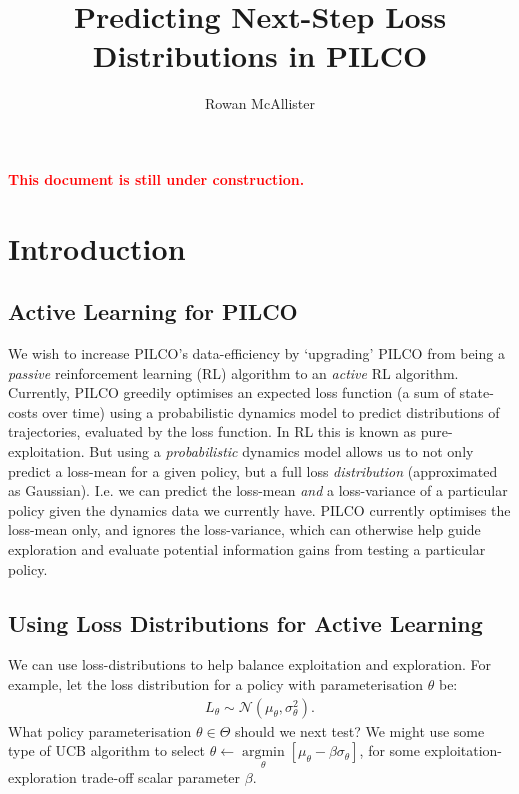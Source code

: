 \documentclass[a4paper,10pt]{article}
\title{Predicting Next-Step Loss Distributions in PILCO}
\author{Rowan McAllister}
\newcommand{\N}{\mathcal{N}}
\newcommand{\red}[1]{\textcolor{red}{#1}}
\begin{document}
\maketitle

\red{\textbf{\large This document is still under construction.}}

\tableofcontents

\section{Introduction}

\subsection{Active Learning for PILCO}
 We wish to increase PILCO's data-efficiency by `upgrading' PILCO
 from being a \textit{passive} reinforcement learning (RL) algorithm
 to an \textit{active} RL algorithm.
 Currently, PILCO greedily optimises an expected loss function (a sum of state-costs over time)
 using a probabilistic dynamics model to predict distributions of trajectories, evaluated by the loss function.
 In RL this is known as pure-exploitation.
 But using a \textit{probabilistic} dynamics model allows us to not only predict a loss-mean for a given policy,
 but a full loss \textit{distribution} (approximated as Gaussian).
 I.e. we can predict the loss-mean \textit{and} a loss-variance of a particular policy
 given the dynamics data we currently have.
 PILCO currently optimises the loss-mean only, and ignores the loss-variance,
 which can otherwise help guide exploration and evaluate potential information gains
 from testing a particular policy.

\subsection{Using Loss Distributions for Active Learning}
 We can use loss-distributions to help balance exploitation and exploration.
 For example, let the loss distribution for a policy with parameterisation $\theta$ be:
 \begin{eqnarray}
 L_\theta \sim \N(\mu_\theta,\sigma^2_\theta).
 \end{eqnarray}
 What policy parameterisation $\theta \in \Theta$ should we next test?
 We might use some type of UCB algorithm to select
 $\theta\leftarrow\underset{\theta}{\operatorname{argmin}}[\mu_\theta - \beta \sigma_\theta]$,
 for some exploitation-exploration trade-off scalar parameter $\beta$.
\end{document}
